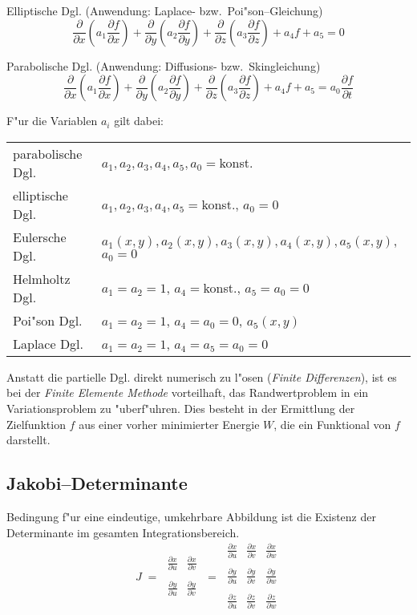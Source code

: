 Elliptische Dgl. (Anwendung: Laplace- bzw.\ Poi"son--Gleichung)
$$\frac{\partial}{\partial x}\left(a_1 \frac{\partial f}{\partial x}\right)+
  \frac{\partial}{\partial y}\left(a_2 \frac{\partial f}{\partial y}\right)+
  \frac{\partial}{\partial z}\left(a_3 \frac{\partial f}{\partial z}\right)+
  a_4 f+a_5=0$$

Parabolische Dgl. (Anwendung: Diffusions- bzw.\ Skingleichung)
$$\frac{\partial}{\partial x}\left(a_1 \frac{\partial f}{\partial x}\right)+
  \frac{\partial}{\partial y}\left(a_2 \frac{\partial f}{\partial y}\right)+
  \frac{\partial}{\partial z}\left(a_3 \frac{\partial f}{\partial z}\right)+
  a_4 f+a_5=a_0\frac{\partial f}{\partial t} $$

F"ur die Variablen $a_i$ gilt dabei:

\begin{tabular}{l@{ --- }l}
 parabolische Dgl.& $a_1,a_2,a_3,a_4,a_5,a_0=$konst. \\
 elliptische Dgl. & $a_1,a_2,a_3,a_4,a_5=$konst., $a_0=0$ \\
 Eulersche Dgl.   & $a_1(x,y),a_2(x,y),a_3(x,y),a_4(x,y),a_5(x,y)$, $a_0=0$ \\
 Helmholtz Dgl.   & $a_1=a_2=1$, $a_4=$konst., $a_5=a_0=0$ \\
 Poi"son Dgl.     & $a_1=a_2=1$, $a_4=a_0=0$, $a_5(x,y)$ \\
 Laplace Dgl.     & $a_1=a_2=1$, $a_4=a_5=a_0=0$ \\
\end{tabular}

Anstatt die partielle Dgl. direkt numerisch zu l"osen ({\sl Finite Differenzen}),
ist es bei der {\sl Finite Elemente Methode} vorteilhaft,
das Randwertproblem in ein Variationsproblem zu
"uberf"uhren. Dies besteht in der Ermittlung der Zielfunktion $f$ aus einer vorher
minimierter Energie $W$, die ein Funktional von $f$ darstellt.

\subsection{Jakobi--Determinante}
Bedingung f"ur eine eindeutige, umkehrbare Abbildung ist die Existenz der
Determinante im gesamten Integrationsbereich.
$$J\; =\; \begin{array}{|cc|}\frac{\partial x}{\partial u}&
\frac{\partial x}{\partial v}\\ & \\
\frac{\partial y}{\partial u}&\frac{\partial y}{\partial v}\\
\end{array}\; =\;\begin{array}{|ccc|}\frac{\partial x}{\partial u}&
\frac{\partial x}{\partial v}&\frac{\partial x}{\partial w}\\ & &\\
\frac{\partial y}{\partial u}&\frac{\partial y}{\partial v}&
\frac{\partial y}{\partial w}\\ & &\\ \frac{\partial z}{\partial u}&
\frac{\partial z}{\partial v}&\frac{\partial z}{\partial w}\\
\end{array}$$

